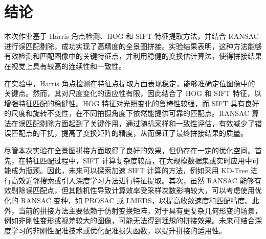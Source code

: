 \documentclass[a4paper, utf8]{ctexart}
\begin{document}
	\section{结论}
	
	本次作业基于 Harris 角点检测、HOG 和 SIFT 特征提取方法，并结合 RANSAC 进行误匹配剔除，成功实现了高精度的全景图拼接。实验结果表明，这种方法能够有效检测和匹配图像中的关键特征点，并利用稳健的变换估计算法，使得拼接结果在视觉上具有较高的连续性和一致性。
	
	在实验中，Harris 角点检测在特征点提取方面表现稳定，能够准确定位图像中的关键点。然而，其对尺度变化的适应性有限，因此结合了 HOG 和 SIFT 特征，以增强特征匹配的稳健性。HOG 特征对光照变化的鲁棒性较强，而 SIFT 具有良好的尺度和旋转不变性，在不同拍摄角度下依然能提供可靠的匹配点。RANSAC 算法在误匹配剔除方面起到了关键作用，通过随机采样和一致性评估，有效减少了错误匹配点的干扰，提高了变换矩阵的精度，从而保证了最终拼接结果的质量。
	
	尽管本次实验在全景图拼接方面取得了良好的效果，但仍存在一定的优化空间。首先，在特征匹配过程中，SIFT 计算复杂度较高，在大规模数据集或实时应用中可能成为瓶颈。因此，未来可以探索加速 SIFT 计算的方法，例如采用 KD-Tree 进行高效近邻搜索或引入深度学习方法进行特征提取。其次，虽然 RANSAC 能够有效剔除误匹配点，但其随机性导致计算效率受采样次数影响较大，可以考虑使用优化的 RANSAC 变种，如 PROSAC 或 LMEDS，以提高收敛速度和匹配精度。此外，当前的拼接方法主要依赖于仿射变换矩阵，对于具有更复杂几何形变的场景，例如非刚性变形或视差较大的图像，可能无法得到理想的拼接效果。未来可结合深度学习的非刚性配准技术或优化配准损失函数，以提升拼接的适用性。
	
	\let\cleardoublepage\clearpage
	
\end{document}
